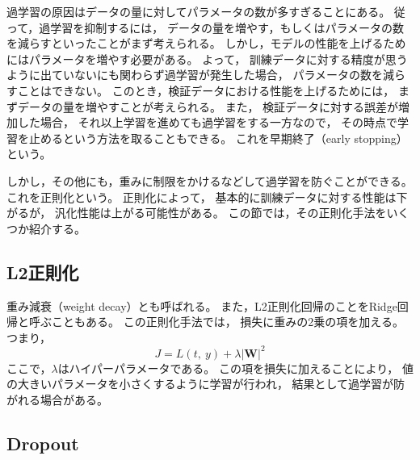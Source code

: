 \documentclass[class=jsarticle, crop=false, dvipdfmx, fleqn]{standalone}
\begin{document}
過学習の原因はデータの量に対してパラメータの数が多すぎることにある。
従って，過学習を抑制するには，
データの量を増やす，もしくはパラメータの数を減らすといったことがまず考えられる。
しかし，モデルの性能を上げるためにはパラメータを増やす必要がある。
よって，
訓練データに対する精度が思うように出ていないにも関わらず過学習が発生した場合，
パラメータの数を減らすことはできない。
このとき，検証データにおける性能を上げるためには，
まずデータの量を増やすことが考えられる。
また，
検証データに対する誤差が増加した場合，
それ以上学習を進めても過学習をする一方なので，
その時点で学習を止めるという方法を取ることもできる。
これを早期終了（early stopping）という。

しかし，その他にも，重みに制限をかけるなどして過学習を防ぐことができる。
これを正則化という。
正則化によって，
基本的に訓練データに対する性能は下がるが，
汎化性能は上がる可能性がある。
この節では，その正則化手法をいくつか紹介する。


\begin{comment}
\subsection{L1正則化}%

LASSO (Least Absolute Shrinkage and Selection Operator)とも呼ばれる。
損失に重みの絶対値の項を加える。
\begin{equation}
J = L(t,\ y) + \lambda |\bm{W}|
\end{equation}
ここで，$\lambda$はハイパーパラメータである。
説明変数のうち一部を0にすることによってスパースな解を得て，
変数選択を行うことができるといった特徴があるが，
学習が不安定になる。
\end{comment}


\subsection{L2正則化}

重み減衰（weight decay）とも呼ばれる。
また，L2正則化回帰のことをRidge回帰と呼ぶこともある。
この正則化手法では，
損失に重みの2乗の項を加える。
つまり，
\begin{equation}
J = L(t,\ y) + \lambda |\bm{W}|^2
\end{equation}
ここで，$\lambda$はハイパーパラメータである。
この項を損失に加えることにより，
値の大きいパラメータを小さくするように学習が行われ，
結果として過学習が防がれる場合がある。


\subsection{Dropout}
\end{document}
